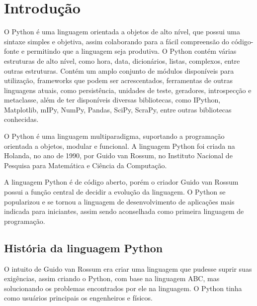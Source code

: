 


\chapter{ Introdução}

O Python é uma linguagem orientada a objetos de alto nível, que possui uma sintaxe simples e objetiva, assim colaborando para a fácil compreensão do código-fonte e permitindo que a linguagem seja produtiva. O Python contém várias estruturas de alto nível, como hora, data, dicionários, listas, complexos, entre outras estruturas. Contém um amplo conjunto de módulos disponíveis para utilização, frameworks que podem ser acrescentados, ferramentas de outras linguagens atuais, como persistência, unidades de teste, geradores, introspecção e metaclasse, além de ter disponíveis diversas bibliotecas, como IPython, Matplotlib, mIPy, NumPy, Pandas, SciPy, ScraPy, entre outras bibliotecas conhecidas.

O Python é uma linguagem multiparadigma, suportando a programação orientada a objetos, modular e funcional. A linguagem Python foi criada na Holanda, no ano de 1990, por Guido van Rossum, no Instituto Nacional de Pesquisa para Matemática e Ciência da Computação. \cite{Borges2014}

A linguagem Python é de código aberto, porém o criador Guido van Rossum possui a função central de decidir a evolução da linguagem. O Python se popularizou e se tornou a linguagem de desenvolvimento de aplicações mais indicada para iniciantes, assim sendo aconselhada como primeira linguagem de programação. \cite{Perkovic2016}




\section{História da linguagem Python}

O intuito de Guido van Rossum era criar uma linguagem que pudesse suprir suas exigências, assim criando o Python, com base na linguagem ABC, mas solucionando os problemas encontrados por ele na linguagem. O Python tinha como usuários principais os engenheiros e físicos.


